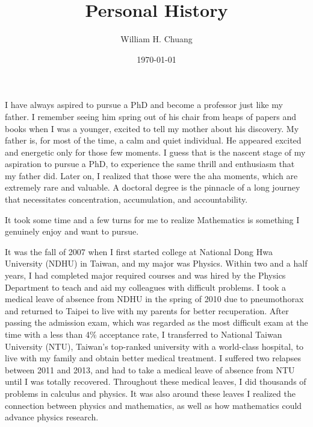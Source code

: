 \documentclass[10pt]{amsart}
\begin{document}
\title{Personal History}
\author{William H. Chuang}
\date{\today}
\maketitle



I have always aspired to pursue a PhD and become a professor just like my father. I remember seeing him spring out of his chair from heaps of papers and books when I was a younger, excited to tell my mother about his discovery. My father is, for most of the time, a calm and quiet individual. He appeared excited and energetic only for those few moments. I guess that is the nascent stage of my aspiration to pursue a PhD, to experience the same thrill and enthusiasm that my father did. Later on, I realized that those were the aha moments, which are extremely rare and valuable. A doctoral degree is the pinnacle of a long journey that necessitates concentration, accumulation, and accountability. 


It took some time and a few turns for me to realize Mathematics is something I genuinely enjoy and want to pursue. 

It was the fall of 2007 when I first started college at National Dong Hwa University (NDHU) in Taiwan, and my major was Physics. Within two and a half years, I had completed major required courses and was hired by the Physics Department to teach and aid my colleagues with difficult problems. I took a medical leave of absence from NDHU in the spring of 2010 due to pneumothorax and returned to Taipei to live with my parents for better recuperation. After passing the admission exam, which was regarded as the most difficult exam at the time with a less than 4$\%$ acceptance rate, I transferred to National Taiwan University (NTU), Taiwan's top-ranked university with a world-class hospital, to live with my family and obtain better medical treatment. I suffered two relapses between 2011 and 2013, and had to take a medical leave of absence from NTU until I was totally recovered. Throughout these medical leaves, I did thousands of problems in calculus and physics. It was also around these leaves I realized the connection between physics and mathematics, as well as how mathematics could advance physics research.
\end{document}
